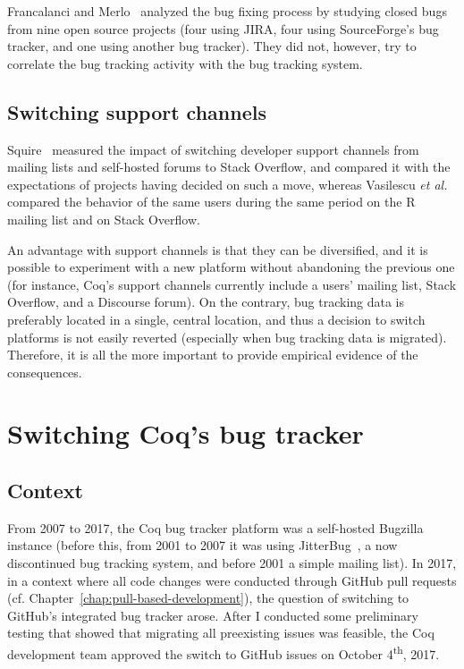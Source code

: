 Francalanci and Merlo~\cite{francalanci2008empirical} analyzed the bug fixing process by studying closed bugs from nine open source projects (four using JIRA, four using SourceForge's bug tracker, and one using another bug tracker). They did not, however, try to correlate the bug tracking activity with the bug tracking system.

\subsection{Switching support channels}

Squire~\cite{squire2015should} measured the impact of switching developer support channels from mailing lists and self-hosted forums to Stack Overflow, and compared it with the expectations of projects having decided on such a move,
whereas Vasilescu \emph{et al.}~\cite{vasilescu2014social} compared the behavior of the same users during the same period on the R mailing list and on Stack Overflow.

An advantage with support channels is that they can be diversified, and it is possible to experiment with a new platform without abandoning the previous one (for instance, Coq's support channels currently include a users' mailing list, Stack Overflow, and a Discourse forum).
On the contrary, bug tracking data is preferably located in a single, central location, and thus a decision to switch platforms is not easily reverted (especially when bug tracking data is migrated).
Therefore, it is all the more important to provide empirical evidence of the consequences.

\section{Switching Coq's bug tracker}

\subsection{Context}

\label{sec:context}

From 2007 to 2017, the Coq bug tracker platform was a self-hosted Bugzilla~\cite{barnson2001bugzilla} instance (before this, from 2001 to 2007 it was using JitterBug~\cite{tridgell_jitterbug}, a now discontinued bug tracking system, and before 2001 a simple mailing list).
In 2017, in a context where all code changes were conducted through GitHub pull requests (cf. Chapter~\ref{chap:pull-based-development}), the question of switching to GitHub's integrated bug tracker arose.
After I conducted some preliminary testing that showed that migrating all preexisting issues was feasible, the Coq development team approved the switch to GitHub issues on October 4\textsuperscript{th}, 2017.

